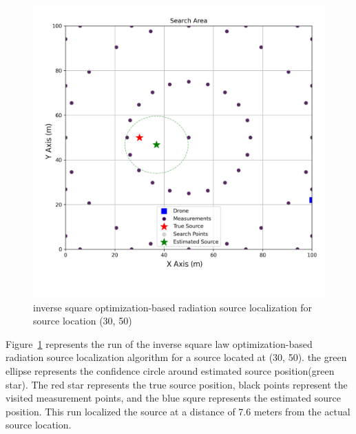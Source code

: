 \documentclass[../report.tex]{subfiles}
\begin{document}
    \begin{figure}[ht]
        \centering
        \includegraphics[width=\linewidth]{figures/inverse_square_method_with_label.png}
        \caption{inverse square optimization-based radiation source localization for source location (30, 50)}
        \label{fig:inverse_square_method_plot}
    \end{figure}

    Figure~\ref{fig:inverse_square_method_plot} represents the run of the inverse square law optimization-based radiation source localization algorithm for a source located at (30, 50). the green 
    ellipse represents the confidence circle around estimated source position(green star). The red star represents the true source position, black points represent the visited measurement points, and 
    the blue squre represents the estimated source position. This run localized the source at a distance of 7.6 meters from the actual source location.

    
\end{document}
